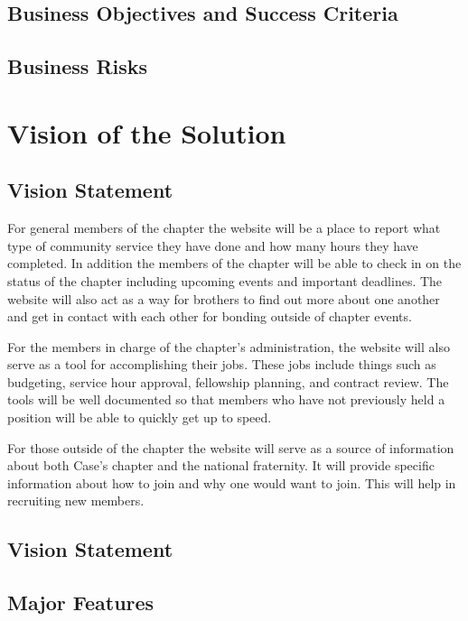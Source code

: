 \documentclass[11pt,letterpaper,rotate]{article}
\begin{document}
\subsection{Business Objectives and Success Criteria}


\subsection{Business Risks}


\section{Vision of the Solution}

\subsection{Vision Statement}

For general members of the chapter the website will be a place to report what type of community service they have done and how many hours they have completed. In addition the members of the chapter will be able to check in on the status of the chapter including upcoming events and important deadlines. The website will also act as a way for brothers to find out more about one another and get in contact with each other for bonding outside of chapter events.

For the members in charge of the chapter's administration, the website will also serve as a tool for accomplishing their jobs. These jobs include things such as budgeting, service hour approval, fellowship planning, and contract review. The tools will be well documented so that members who have not previously held a position will be able to quickly get up to speed.

For those outside of the chapter the website will serve as a source of information about both Case's chapter and the national fraternity. It will provide specific information about how to join and why one would want to join. This will help in recruiting new members.


\subsection{Vision Statement}


\subsection{Major Features}
\end{document}
